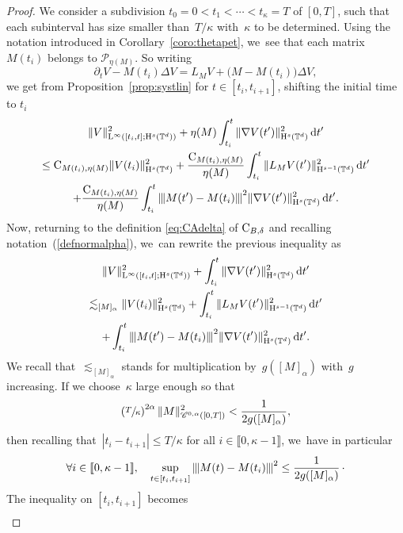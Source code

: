 \documentclass[10pt]{amsart}
\theoremstyle{definition}
\newcommand\T{\mathbb{T}}
\newcommand\dd{\mathrm{d}}
\renewcommand\H{\mathrm{H}}
\renewcommand\L{\mathrm{L}}
\newcommand{\vertiii}[1]{{\vert\kern-0.08em\vert\kern-0.08em\vert #1 \vert\kern-0.08em\vert\kern-0.08em\vert}}
\begin{document}
\begin{proof}
We consider a subdivision $t_0=0<t_1<\cdots < t_\kappa = T$ of $[0,T]$, such that each subinterval has size smaller than~$T/\kappa$ with~$\kappa$ to be determined. Using the notation introduced in Corollary~\ref{coro:thetapet}, we~see that each matrix $M(t_i)$ belongs to $\mathscr{P}_{\eta(M)}$. So writing
\[
\partial_t V - M(t_i)\Delta V = L_{M }V + \bigl(M-M(t_i)\bigr)\Delta V,
\]
we get from Proposition~\ref{prop:systlin} for $t\in[t_i,t_{i+1}]$, shifting the initial time to $t_i$\vspace*{-5pt}
\begin{multline*}
\|V\|_{\L^\infty([t_i,t];\H^s(\T^d))}^2 + \eta(M)\int_{t_i}^{t} \|\nabla V(t')\|_{\H^s(\T^d)}^2\,\dd t'\\
\leq \textnormal{C}_{M(t_i),\eta(M)} \|V(t_i)\|_{\H^s(\T^d)}^2 + \frac{\textnormal{C}_{M(t_i),\eta(M)}}{\eta(M)} \int_{t_i}^t\|L_{M }V(t')\|_{\H^{s-1}(\T^d)}^2\,\dd t' \\
+ \frac{\textnormal{C}_{M(t_i),\eta(M)}}{\eta(M)} \int_{t_i}^t \vertiii{M(t')-M(t_i)}^2 \|\nabla V(t')\|_{\H^s(\T^d)}^2\,\dd t'.
\end{multline*}
Now, returning to the definition \eqref{eq:CAdelta} of $\textnormal{C}_{B,\delta}$ and recalling notation~(\ref{defnormalpha}), we~can rewrite the previous inequality as
\begin{multline*}
\|V\|_{\L^\infty([t_i,t];\H^s(\T^d))}^2 + \int_{t_i}^{t} \|\nabla V(t')\|_{\H^s(\T^d)}^2\,\dd t'\\
\lesssim_{[M]_\alpha} \|V(t_i)\|_{\H^s(\T^d)}^2
+ \int_{t_i}^t\|L_{M }V(t')\|_{\H^{s-1}(\T^d)}^2\,\dd t' \\
+ \int_{t_i}^t \vertiii{M(t')-M(t_i)}^2 \|\nabla V(t')\|_{\H^s(\T^d)}^2\,\dd t'.
\end{multline*}
We recall that~$\lesssim_{[M]_\alpha}$ stands for multiplication by~$g([M]_\alpha)$ with~$g$ increasing.
If we choose~$ \kappa$ large enough so that
\begin{equation}\label{ineq:L}
\left(\sfrac{T}\kappa\right)^{2\alpha} \|M\|_{\mathscr{C}^{0,\alpha}([0,T])}^2 < \frac{1}{2g([M]_\alpha)},
\end{equation}
then recalling that~$|t_i-t_{i+1 }| \leq T/\kappa $ for all $i\in\llbracket 0,\kappa-1\rrbracket$, we~have in particular
\[
\forall i\in\llbracket 0,\kappa-1\rrbracket, \quad \sup_{t \in [t_i,t_{i+1}]} \vertiii{M(t)-M(t_i)}^2 \leq \frac{1}{2g([M]_\alpha)} \, \cdotp
\]
The inequality on $[t_i,t_{i+1}]$ becomes
\begin{multline*}

\end{multline*}
\end{proof}
\end{document}
